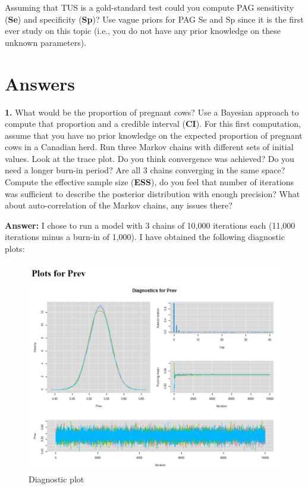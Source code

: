 \documentclass[
]{book}
\begin{document}
Assuming that TUS is a gold-standard test could you compute PAG
sensitivity (\textbf{Se}) and specificity (\textbf{Sp})? Use vague
priors for PAG Se and Sp since it is the first ever study on this topic
(i.e., you do not have any prior knowledge on these unknown parameters).

\hypertarget{answers}{%
\section{Answers}\label{answers}}

\textbf{1.} What would be the proportion of pregnant cows? Use a
Bayesian approach to compute that proportion and a credible interval
(\textbf{CI}). For this first computation, assume that you have no prior
knowledge on the expected proportion of pregnant cows in a Canadian
herd. Run three Markov chains with different sets of initial values.
Look at the trace plot. Do you think convergence was achieved? Do you
need a longer burn-in period? Are all 3 chains converging in the same
space? Compute the effective sample size (\textbf{ESS}), do you feel
that number of iterations was sufficient to describe the posterior
distribution with enough precision? What about auto-correlation of the
Markov chains, any issues there?

\textbf{Answer:} I chose to run a model with 3 chains of 10,000
iterations each (11,000 iterations minus a burn-in of 1,000). I have
obtained the following diagnostic plots:

\begin{figure}
\centering
\includegraphics{Figures/Ex1_Q1_Dx.png}
\caption{Diagnostic plot}
\end{figure}
\end{document}
